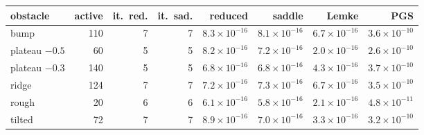 \begin{tabular}{lrrrrrrr}
\toprule
obstacle & active & it.\ red. & it.\ sad. & reduced & saddle & Lemke & PGS \\
\midrule
bump & 110 & 7 & 7 & $8.3\times10^{-16}$ & $8.1\times10^{-16}$ & $6.7\times10^{-16}$ & $3.6\times10^{-10}$ \\
plateau $-0.5$ & 60 & 5 & 5 & $8.2\times10^{-16}$ & $7.2\times10^{-16}$ & $2.0\times10^{-16}$ & $2.6\times10^{-10}$ \\
plateau $-0.3$ & 140 & 5 & 5 & $6.8\times10^{-16}$ & $6.8\times10^{-16}$ & $4.3\times10^{-16}$ & $3.7\times10^{-10}$ \\
ridge & 124 & 7 & 7 & $7.2\times10^{-16}$ & $7.3\times10^{-16}$ & $6.7\times10^{-16}$ & $3.5\times10^{-10}$ \\
rough & 20 & 6 & 6 & $6.1\times10^{-16}$ & $5.8\times10^{-16}$ & $2.1\times10^{-16}$ & $4.8\times10^{-11}$ \\
tilted & 72 & 7 & 7 & $8.9\times10^{-16}$ & $7.0\times10^{-16}$ & $3.3\times10^{-16}$ & $3.2\times10^{-10}$ \\
\bottomrule
\end{tabular}
